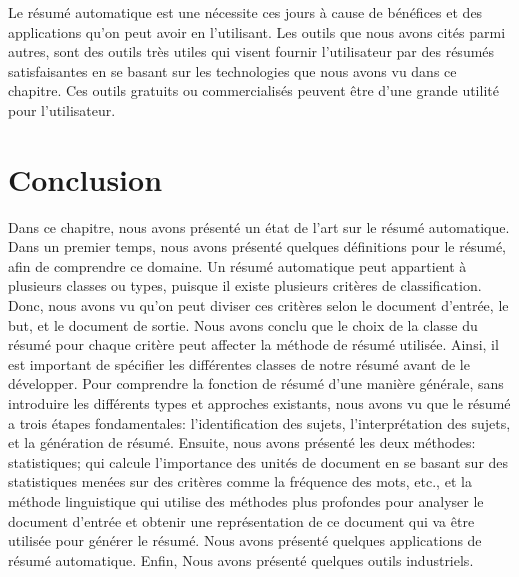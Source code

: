 \documentclass[a4paper,12pt,oneside]{../use/ESIthesis}
\begin{document}
Le résumé automatique est une nécessite ces jours à cause de bénéfices et des applications qu'on peut avoir en l'utilisant. 
Les outils que nous avons cités parmi autres, sont des outils très utiles qui visent fournir l'utilisateur par des résumés satisfaisantes en se basant sur les technologies que nous avons vu dans ce chapitre. 
Ces outils gratuits ou commercialisés peuvent être d'une grande utilité pour l'utilisateur.

\section{Conclusion}

Dans ce chapitre, nous avons présenté un état de l'art sur le résumé automatique. 
Dans un premier temps, nous avons présenté quelques définitions pour le résumé, afin de comprendre ce domaine. 
Un résumé automatique peut appartient à plusieurs classes ou types, puisque il existe plusieurs critères de classification. 
Donc, nous avons vu qu'on peut diviser ces critères selon le document d'entrée, le but, et le document de sortie. 
Nous avons conclu que le choix de la classe du résumé pour chaque critère peut affecter la méthode de résumé utilisée. 
Ainsi, il est important de spécifier les différentes classes de notre résumé avant de le développer. 
Pour comprendre la fonction de résumé d'une manière générale, sans introduire les différents types et approches existants, nous avons vu que le résumé a trois étapes fondamentales: l'identification des sujets, l'interprétation des sujets, et la génération de résumé. 
Ensuite, nous avons présenté les deux méthodes: statistiques; qui calcule l'importance des unités de document en se basant sur des statistiques menées sur des critères comme la fréquence des mots, etc., et la méthode linguistique qui utilise des méthodes plus profondes pour analyser le document d'entrée et obtenir une représentation de ce document qui va être utilisée pour générer le résumé. 
Nous avons présenté quelques applications de résumé automatique. 
Enfin, Nous avons présenté quelques outils industriels.
\end{document}
